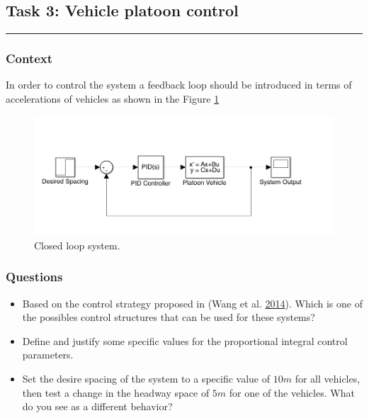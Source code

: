 \documentclass[]{book}
\providecommand{\tightlist}{%
  \setlength{\itemsep}{0pt}\setlength{\parskip}{0pt}}
\theoremstyle{definition}
\theoremstyle{definition}
\theoremstyle{definition}
\theoremstyle{remark}
\begin{document}
\hypertarget{task-3-vehicle-platoon-control}{%
\subsection*{Task 3: Vehicle platoon
control}\label{task-3-vehicle-platoon-control}}

\begin{center}\rule{0.5\linewidth}{\linethickness}\end{center}

\hypertarget{context-7}{%
\subsubsection*{Context}\label{context-7}}

In order to control the system a feedback loop should be introduced in
terms of accelerations of vehicles as shown in the Figure
\ref{fig:closedcav}



\begin{figure}

{\centering \includegraphics{images/p2-03-closed-loop} 

}

\caption{Closed loop system.}\label{fig:closedcav}
\end{figure}

\hypertarget{questions-6}{%
\subsubsection*{Questions}\label{questions-6}}

\begin{itemize}
\tightlist
\item
  Based on the control strategy proposed in (Wang et al.
  \protect\hyperlink{ref-Meng2014b:TR-C}{2014}). Which is one of the
  possibles control structures that can be used for these systems?
\item
  Define and justify some specific values for the proportional integral
  control parameters.
\item
  Set the desire spacing of the system to a specific value of \(10m\)
  for all vehicles, then test a change in the headway space of \(5m\)
  for one of the vehicles. What do you see as a different behavior?
\end{itemize}
\end{document}
